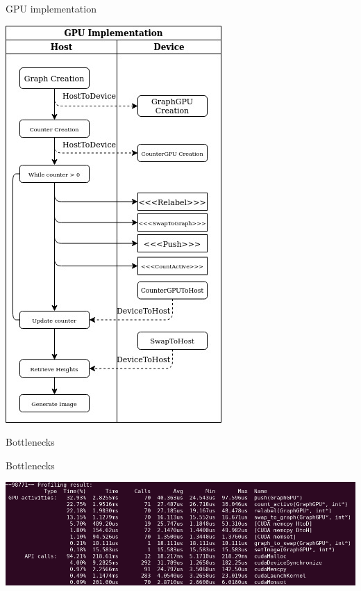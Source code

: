 \documentclass[10pt]{beamer}
\begin{document}
\begin{frame}{GPU implementation}
    \begin{center}
        \includegraphics[scale=0.4]{../pics/gpu_diagram.jpg}
    \end{center}
\end{frame}

\begin{frame}{Bottlenecks}
\end{frame}

\begin{frame}{Bottlenecks}
    \begin{center}
        \includegraphics[scale=0.4]{../pics/gpu_prof1_cut.png}
    \end{center}
\end{frame}
\end{document}
